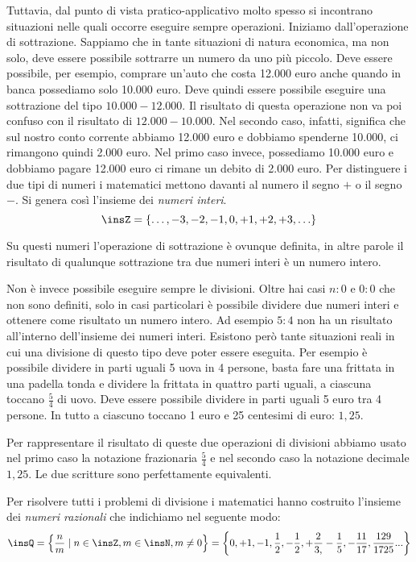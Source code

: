 Tuttavia, dal punto di vista pratico-applicativo molto spesso si incontrano 
situazioni nelle quali occorre eseguire sempre operazioni. Iniziamo 
dall'operazione di sottrazione. Sappiamo che in tante situazioni di natura 
economica, ma non solo, deve essere possibile sottrarre un numero da uno più 
piccolo. Deve essere possibile, per esempio, comprare un'auto che costa 12.000 
euro anche quando in banca possediamo solo 10.000 euro. Deve quindi essere 
possibile eseguire una sottrazione del tipo $10.000-12.000$. Il risultato di 
questa operazione non va poi confuso con il risultato di $12.000-10.000$. Nel 
secondo caso, infatti, significa che sul nostro conto corrente abbiamo 12.000 
euro e dobbiamo spenderne 10.000, ci rimangono quindi 2.000 euro. Nel primo caso 
invece, possediamo 10.000 euro e dobbiamo pagare
12.000 euro ci rimane un debito di 2.000 euro. Per distinguere i due tipi di 
numeri i matematici mettono davanti al numero il segno $+$ o il segno $-$. Si 
genera così l'insieme dei \emph{numeri interi}.
\[\insZ=\{\ldots,-3,-2,-1,0,+1,+2,+3,\ldots\}\]

Su questi numeri l'operazione di sottrazione è ovunque definita, in altre parole 
il risultato di qualunque sottrazione tra due numeri interi è un numero intero.

Non è invece possibile eseguire sempre le divisioni. Oltre hai casi $n:0$ e 
$0:0$ che non sono definiti, solo in casi particolari è possibile dividere 
due numeri interi e ottenere come risultato un numero intero. Ad esempio $5:4$ 
non ha un risultato all'interno dell'insieme dei numeri interi. 
Esistono però tante situazioni reali in cui una divisione di questo tipo deve 
poter essere eseguita. Per esempio è possibile dividere in parti uguali 5 uova 
in 4 persone, basta fare una frittata in una padella tonda e dividere la 
frittata in quattro parti uguali, a ciascuna toccano $\frac{5}{4}$ di uovo. Deve
essere possibile dividere in parti uguali 5 euro tra 4 persone. 
In tutto a ciascuno toccano 1 euro e 25 centesimi di euro: $1,25$.

Per rappresentare il risultato di queste due operazioni di divisioni abbiamo 
usato nel primo caso la notazione frazionaria $\frac{5}{4}$ e nel secondo caso 
la notazione decimale $1,25$. Le due scritture sono perfettamente equivalenti.

Per risolvere tutti i problemi di divisione i matematici hanno costruito 
l'insieme dei \emph{numeri razionali} che indichiamo nel seguente modo:
\[
\insQ=\left\{\frac{n}{m} \mid n\in \insZ,m\in \insN,m\neq
0\right\}=\left\{0,+1,-1,\frac{1}{2},-\frac{1}{2},+\frac{2}{3,}-\frac{1}{5},
-\frac{11}{17},\frac{129}{1725}...\right\}
\]

